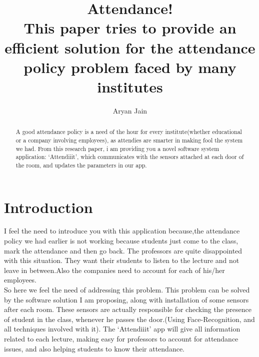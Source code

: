 \documentclass[conference]{IEEEtran}
\begin{document}
\title{Attendance!\\
{\footnotesize This paper tries to provide an efficient solution for the attendance policy problem faced by many institutes}
}
\author{Aryan Jain}
\maketitle

\begin{abstract}
A good attendance policy is a need of the hour for every institute(whether educational or a company involving employees), as attendies are smarter in making fool the system we had. From this research paper, i am providing you a novel software system application: `Attendiiit', which communicates with the sensors attached at each door of the room, and updates the parameters in our app.
\end{abstract}


\section{Introduction}
I feel the need to introduce you with this application because,the attendance policy we had earlier is not working because students just come to the class, mark the attendance and then go back. The professors are quite disappointed with this situation. They want their students to listen to the lecture and not leave in between.Also the companies need to account for each of his/her employees.\\
So here we feel the need of addressing this problem. This problem can be solved by the software solution I am proposing, along with installation of some sensors after each room. These sensors are actually responsible for checking the presence of student in the class, whenever he passes the door.(Using Face-Recognition, and all techniques involved with it). The `Attendiiit' app will give all information related to each lecture, making easy for professors to account for attendance issues, and also helping students to know their attendance.
\end{document}
